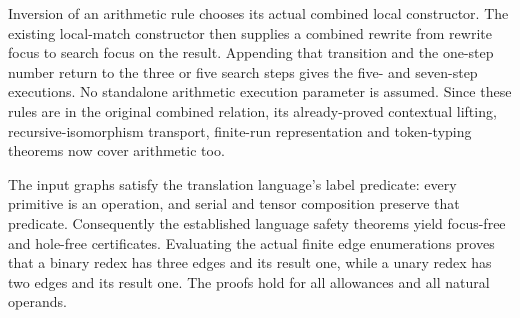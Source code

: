







Inversion of an arithmetic rule chooses its actual combined local
constructor. The existing local-match constructor then supplies a combined
rewrite from rewrite focus to search focus on the result. Appending that
transition and the one-step number return to the three or five search steps
gives the five- and seven-step executions. No standalone arithmetic execution
parameter is assumed. Since these rules are in the original combined
relation, its already-proved contextual lifting, recursive-isomorphism
transport, finite-run representation and token-typing theorems now cover
arithmetic too.




The input graphs satisfy the translation language's label predicate:
every primitive is an operation, and serial and tensor composition preserve
that predicate. Consequently the established language safety theorems yield
focus-free and hole-free certificates. Evaluating the actual finite edge
enumerations proves that a binary redex has three edges and its result one,
while a unary redex has two edges and its result one. The proofs hold for
all allowances and all natural operands.




